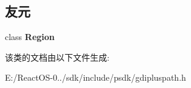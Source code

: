 \subsection*{友元}
\begin{DoxyCompactItemize}
\item 
\mbox{\label{class_graphics_path_aae6f9325706131f3b6fb8accb1508d76}} 
class {\bfseries Region}
\end{DoxyCompactItemize}


该类的文档由以下文件生成\+:\begin{DoxyCompactItemize}
\item 
E\+:/\+React\+O\+S-\/0../sdk/include/psdk/gdipluspath.\+h\end{DoxyCompactItemize}
